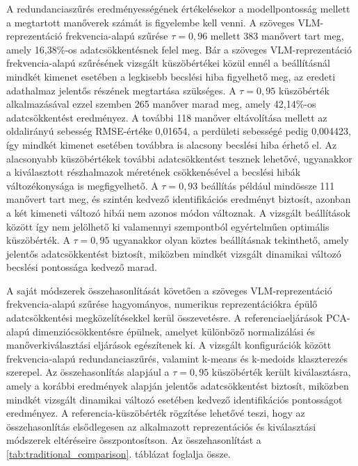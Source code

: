 \documentclass[12pt,a4paper,onehalfspacing, oneside]{book} %
\begin{document}
A redundanciaszűrés eredményességének értékelésekor a modellpontosság mellett a megtartott manőverek számát is figyelembe kell venni. A szöveges VLM-reprezentáció frekvencia-alapú szűrése $\tau=0{,}96$ mellett 383 manővert tart meg, amely 16,38\%-os adatcsökkentésnek felel meg. Bár a szöveges VLM-reprezentáció frekvencia-alapú szűrésének vizsgált küszöbértékei közül ennél a beállításnál mindkét kimenet esetében a legkisebb becslési hiba figyelhető meg, az eredeti adathalmaz jelentős részének megtartása szükséges. A $\tau=0{,}95$ küszöbérték alkalmazásával ezzel szemben 265 manőver marad meg, amely 42,14\%-os adatcsökkentést eredményez. A további 118 manőver eltávolítása mellett az oldalirányú sebesség RMSE-értéke 0,01654, a perdületi sebességé pedig 0,004423, így mindkét kimenet esetében továbbra is alacsony becslési hiba érhető el. Az alacsonyabb küszöbértékek további adatcsökkentést tesznek lehetővé, ugyanakkor a kiválasztott részhalmazok méretének csökkenésével a becslési hibák változékonysága is megfigyelhető. A $\tau=0{,}93$ beállítás például mindössze 111 manővert tart meg, és szintén kedvező identifikációs eredményt biztosít, azonban a két kimeneti változó hibái nem azonos módon változnak. A vizsgált beállítások között így nem jelölhető ki valamennyi szempontból egyértelműen optimális küszöbérték. A $\tau=0{,}95$ ugyanakkor olyan köztes beállításnak tekinthető, amely jelentős adatcsökkentést biztosít, miközben mindkét vizsgált dinamikai változó becslési pontossága kedvező marad.

A saját módszerek összehasonlítását követően a szöveges VLM-reprezentáció frekvencia-alapú szűrése hagyományos, numerikus reprezentációkra épülő adatcsökkentési megközelítésekkel kerül összevetésre. A referenciaeljárások PCA-alapú dimenziócsökkentésre épülnek, amelyet különböző normalizálási és manőverkiválasztási eljárások egészítenek ki. A vizsgált konfigurációk között frekvencia-alapú redundanciaszűrés, valamint k-means és k-medoids klaszterezés szerepel. Az összehasonlítás alapjául a $\tau=0{,}95$ küszöbérték került kiválasztásra, amely a korábbi eredmények alapján jelentős adatcsökkentést biztosít, miközben mindkét vizsgált dinamikai változó esetében kedvező identifikációs pontosságot eredményez. A referencia-küszöbérték rögzítése lehetővé teszi, hogy az összehasonlítás elsődlegesen az alkalmazott reprezentációs és kiválasztási módszerek eltéréseire összpontosítson. Az összehasonlítást a \ref{tab:traditional_comparison}. táblázat foglalja össze.
\end{document}
